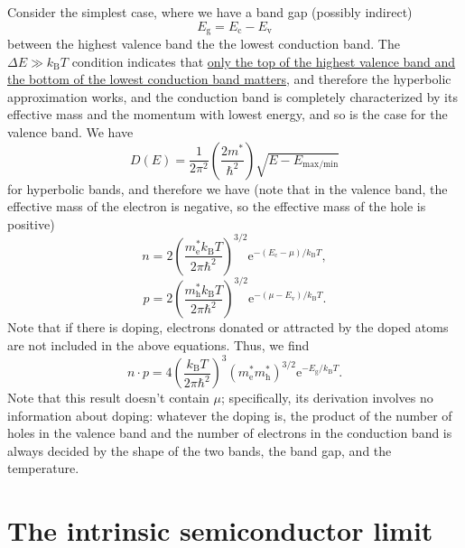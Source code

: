 \documentclass[hyperref, a4paper]{article}
\newcommand*{\ee}{\mathrm{e}}
\newcommand{\kB}{k_{\text{B}}}
\begin{document}
Consider the simplest case, where we have a band gap (possibly indirect) 
\begin{equation}
    E_{\text{g}} = E_{\text{c}} - E_{\text{v}}
\end{equation}
between the highest valence band the the lowest conduction band.
The $\Delta E \gg k_{\text{B}} T$ condition 
indicates that \ul{only the top of the highest valence band 
and the bottom of the lowest conduction band matters,}  
and therefore the hyperbolic approximation works, 
and the conduction band is completely characterized by its effective mass 
and the momentum with lowest energy,
and so is the case for the valence band.
We have 
\begin{equation}
    D(E) = \frac{1}{2 \pi^2} \left( \frac{2 m^*}{\hbar^2} \right) \sqrt{E - E_{\text{max/min}}}
\end{equation}
for hyperbolic bands,
and therefore we have (note that in the valence band, the effective mass of the electron is negative,
so the effective mass of the hole is positive) 
\begin{equation}
    n = 2 \left( \frac{m_\text{e}^* k_{\text{B}} T}{2 \pi \hbar^2} \right)^{3/2} 
    \ee^{- (E_{\text{c}} - \mu) / k_{\text{B}} T},
    \label{eq:n-def}
\end{equation}
\begin{equation}
    p = 2 \left( \frac{m_\text{h}^* k_{\text{B}} T}{2 \pi \hbar^2} \right)^{3/2} 
    \ee^{- (\mu - E_{\text{v}}) / k_{\text{B}} T}.
\end{equation}
Note that if there is doping, electrons donated or attracted by the doped atoms 
are not included in the above equations.
Thus, we find 
\begin{equation}
    n \cdot p = 4 \left(
        \frac{\kB T}{2 \pi \hbar^2} 
    \right)^3
    (m_{\text{e}}^* m_{\text{h}}^*)^{3/2} \ee^{- E_{\text{g}} / \kB T}. 
    \label{eq:n-p-product}
\end{equation}
Note that this result doesn't contain $\mu$;
specifically, its derivation involves no information about doping: 
whatever the doping is, 
the product of the number of holes in the valence band 
and the number of electrons in the conduction band 
is always decided by the shape of the two bands,
the band gap, and the temperature.

\section{The intrinsic semiconductor limit}
\end{document}
